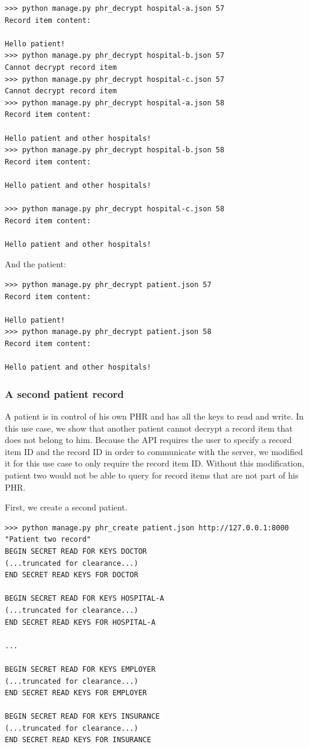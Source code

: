 \documentclass[a4paper]{article}
\begin{document}
			\begin{lstlisting}
>>> python manage.py phr_decrypt hospital-a.json 57
Record item content:

Hello patient!
>>> python manage.py phr_decrypt hospital-b.json 57
Cannot decrypt record item
>>> python manage.py phr_decrypt hospital-c.json 57
Cannot decrypt record item
>>> python manage.py phr_decrypt hospital-a.json 58
Record item content:

Hello patient and other hospitals!
>>> python manage.py phr_decrypt hospital-b.json 58
Record item content:

Hello patient and other hospitals!

>>> python manage.py phr_decrypt hospital-c.json 58
Record item content:

Hello patient and other hospitals!
			\end{lstlisting}

			And the patient:

			\begin{lstlisting}
>>> python manage.py phr_decrypt patient.json 57
Record item content:

Hello patient!
>>> python manage.py phr_decrypt patient.json 58
Record item content:

Hello patient and other hospitals!
			\end{lstlisting}
		
		\subsubsection{A second patient record}\label{sec:usecase_8}
			A patient is in control of his own PHR and has all the keys to read and write. In this use case, we show that another patient cannot decrypt a record item that does not belong to him. Because the API requires the user to specify a record item ID and the record ID in order to communicate with the server, we modified it for this use case to only require the record item ID. Without this modification, patient two would not be able to query for record items that are not part of his PHR.
			
			First, we create a second patient.
			
			\begin{lstlisting}
>>> python manage.py phr_create patient.json http://127.0.0.1:8000 "Patient two record"
BEGIN SECRET READ FOR KEYS DOCTOR
(...truncated for clearance...)
END SECRET READ KEYS FOR DOCTOR

BEGIN SECRET READ FOR KEYS HOSPITAL-A
(...truncated for clearance...)
END SECRET READ KEYS FOR HOSPITAL-A

...

BEGIN SECRET READ FOR KEYS EMPLOYER
(...truncated for clearance...)
END SECRET READ KEYS FOR EMPLOYER

BEGIN SECRET READ FOR KEYS INSURANCE
(...truncated for clearance...)
END SECRET READ KEYS FOR INSURANCE
			\end{lstlisting}
			
\end{document}
